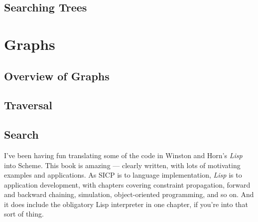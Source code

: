 \documentclass[12pt,openright,draft]{book}
\begin{document}
\section{Searching Trees}

\chapter{Graphs}

\section{Overview of Graphs}










\section{Traversal}


\section{Search}


I've been having fun translating some of the code in Winston and
Horn's \emph{Lisp} into Scheme.  This book is amazing --- clearly
written, with lots of motivating examples and applications.  As SICP
is to language implementation, \emph{Lisp} is to application
development, with chapters covering constraint propagation, forward
and backward chaining, simulation, object-oriented programming, and so
on.  And it does include the obligatory Lisp interpreter in one
chapter, if you're into that sort of thing.
\end{document}
